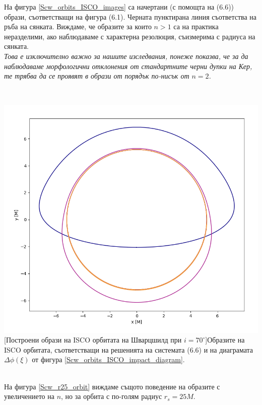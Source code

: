 \begin{minipage}{20em}
На фигура \ref{Scw_orbits_ISCO_images} са начертани (с помощта на (6.6)) образи, съответстващи на фигура (6.1). Черната пунктирана линия съответства на ръба на сянката. Виждаме, че образите за които $n>1$ са на практика неразделими, ако наблюдаваме с характерна резолюция, съизмерима с радиуса на сянката.\\

\emph{Това е изключително важно за нашите изследвания, понеже показва, че за да наблюдаваме морфологични отклонения от стандартните черни дупки на Кер, те трябва да се проявят в образи от порядък по-нисък от $n = 2$.}
\end{minipage}\,\,\,
\begin{minipage}{16em}
	\includegraphics[scale = 0.3]{Schw_70_deg_ISCO.png}
	[Построени образи на ISCO орбитата на Шварцшилд при $i = 70^\circ$]{\small Образите на ISCO орбитата, съответстващи на решенията на системата (6.6) и на диаграмата $\Delta\phi(\xi)$ от фигура \ref{Scw_orbits_ISCO_impact_diagram}.}
	\label{Scw_orbits_ISCO_images}
\end{minipage}\\

На фигура \ref{Scw_r25_orbit} виждаме същото поведение на образите с увеличението на $n$, но за орбита с по-голям радиус $r_s = 25M$.


